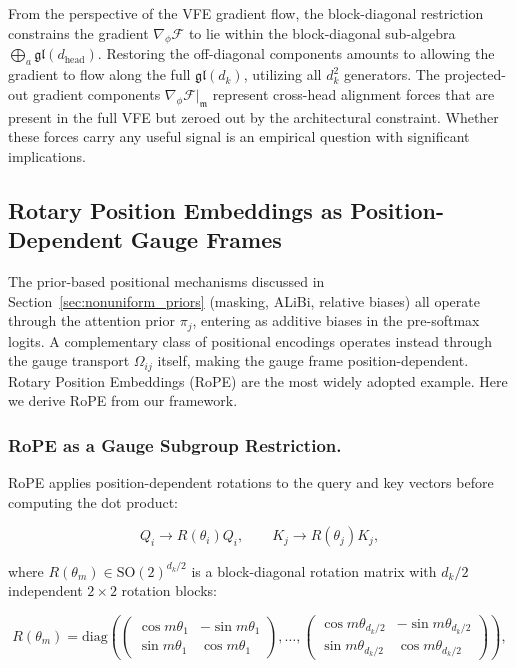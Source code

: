 \documentclass[twoside,11pt]{article}
\begin{document}
From the perspective of the VFE gradient flow, the block-diagonal restriction constrains the gradient $\nabla_\phi \mathcal{F}$ to lie within the block-diagonal sub-algebra $\bigoplus_a \mathfrak{gl}(d_{\text{head}})$. Restoring the off-diagonal components amounts to allowing the gradient to flow along the full $\mathfrak{gl}(d_k)$, utilizing all $d_k^2$ generators. The projected-out gradient components $\nabla_\phi \mathcal{F}\big|_{\mathfrak{m}}$ represent cross-head alignment forces that are present in the full VFE but zeroed out by the architectural constraint. Whether these forces carry any useful signal is an empirical question with significant implications.



\subsection{Rotary Position Embeddings as Position-Dependent Gauge Frames}
\label{sec:rope}

The prior-based positional mechanisms discussed in Section~\ref{sec:nonuniform_priors} (masking, ALiBi, relative biases) all operate through the attention prior $\pi_j$, entering as additive biases in the pre-softmax logits. A complementary class of positional encodings operates instead through the gauge transport $\Omega_{ij}$ itself, making the gauge frame position-dependent. Rotary Position Embeddings (RoPE) \citep{su2024roformer} are the most widely adopted example. Here we derive RoPE from our framework.

\subsubsection{RoPE as a Gauge Subgroup Restriction.}

RoPE applies position-dependent rotations to the query and key vectors before computing the dot product:

\begin{equation}
Q_i \to R(\theta_i) Q_i, \qquad K_j \to R(\theta_j) K_j,
\end{equation}

where $R(\theta_m) \in \mathrm{SO}(2)^{d_k/2}$ is a block-diagonal rotation matrix with $d_k/2$ independent $2\times 2$ rotation blocks:

\begin{equation}
R(\theta_m) = \mathrm{diag} \left(
\begin{pmatrix} \cos m\theta_1 & -\sin m\theta_1 \\ \sin m\theta_1 & \cos m\theta_1 \end{pmatrix},
 \ldots ,
\begin{pmatrix} \cos m\theta_{d_k/2} & -\sin m\theta_{d_k/2} \\ \sin m\theta_{d_k/2} & \cos m\theta_{d_k/2} \end{pmatrix}
\right),
\label{eq:rope_rotation}
\end{equation}
\end{document}
